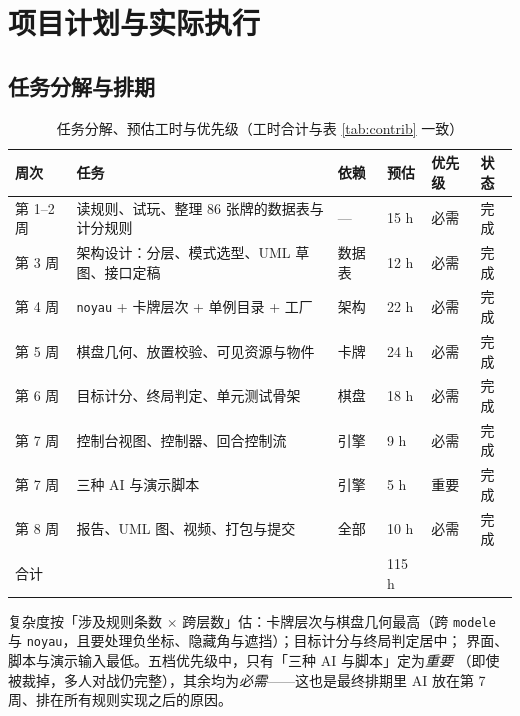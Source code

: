 \documentclass[11pt,a4paper]{ctexart}
\newcommand{\cl}[1]{\texttt{#1}}
\begin{document}
\section{项目计划与实际执行}

\subsection{任务分解与排期}
\begin{table}[h]
\centering
\small
\setlength{\tabcolsep}{4pt}
\begin{tabular}{p{1.7cm}p{6.5cm}p{1.6cm}p{1.2cm}p{1.4cm}p{1.3cm}}
\toprule
周次 & 任务 & 依赖 & 预估 & 优先级 & 状态 \\
\midrule
第 1--2 周 & 读规则、试玩、整理 86 张牌的数据表与计分规则 & --- & 15 h & 必需 & 完成 \\
第 3 周 & 架构设计：分层、模式选型、UML 草图、接口定稿 & 数据表 & 12 h & 必需 & 完成 \\
第 4 周 & \cl{noyau} + 卡牌层次 + 单例目录 + 工厂 & 架构 & 22 h & 必需 & 完成 \\
第 5 周 & 棋盘几何、放置校验、可见资源与物件 & 卡牌 & 24 h & 必需 & 完成 \\
第 6 周 & 目标计分、终局判定、单元测试骨架 & 棋盘 & 18 h & 必需 & 完成 \\
第 7 周 & 控制台视图、控制器、回合控制流 & 引擎 & 9 h & 必需 & 完成 \\
第 7 周 & 三种 AI 与演示脚本 & 引擎 & 5 h & 重要 & 完成 \\
第 8 周 & 报告、UML 图、视频、打包与提交 & 全部 & 10 h & 必需 & 完成 \\
\midrule
合计 & \strut & \strut & 115 h & \strut & \strut \\
\bottomrule
\end{tabular}
\caption{任务分解、预估工时与优先级（工时合计与表 \ref{tab:contrib} 一致）}
\label{tab:planning}
\end{table}

复杂度按「涉及规则条数 $\times$ 跨层数」估：卡牌层次与棋盘几何最高（跨
\cl{modele} 与 \cl{noyau}，且要处理负坐标、隐藏角与遮挡）；目标计分与终局判定居中；
界面、脚本与演示输入最低。五档优先级中，只有「三种 AI 与脚本」定为\emph{重要}
（即使被裁掉，多人对战仍完整），其余均为\emph{必需}——这也是最终排期里 AI
放在第 7 周、排在所有规则实现之后的原因。
\end{document}
